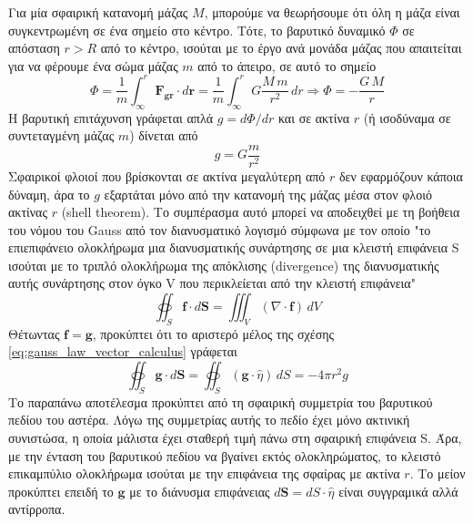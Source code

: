 Για μία σφαιρική κατανομή μάζας $M$, μπορούμε να θεωρήσουμε ότι όλη η μάζα είναι συγκεντρωμένη σε ένα σημείο στο κέντρο. Τότε, το βαρυτικό δυναμικό $\Phi$ σε απόσταση $r>R$ από το κέντρο, ισούται με το έργο ανά μονάδα μάζας που απαιτείται για να φέρουμε ένα σώμα μάζας $m$ από το άπειρο, σε αυτό το σημείο
\begin{equation}
    \Phi = \frac{1}{m}\int_{\infty}^{r} \boldsymbol{F_{\text{gr}}} \cdot d\boldsymbol{r} = \frac{1}{m} \int_{\infty}^{r} G\frac{M \,m }{r^2} \,dr \Rightarrow \Phi = - \frac{G \,M}{r}
\end{equation}
H βαρυτική επιτάχυνση γράφεται απλά $g = d\Phi / dr$ και σε ακτίνα $r$ (ή ισοδύναμα σε συντεταγμένη μάζας $m$) δίνεται από 
\begin{equation}
    \label{eq:gravitational_field}
    g = G \frac{m}{r^2}
\end{equation}
Σφαιρικοί φλοιοί που βρίσκονται σε ακτίνα μεγαλύτερη από $r$ δεν εφαρμόζουν κάποια δύναμη, άρα το $g$ εξαρτάται μόνο από την κατανομή της μάζας μέσα στον φλοιό ακτίνας $r$ (shell theorem). Το συμπέρασμα αυτό μπορεί να αποδειχθεί με τη βοήθεια του νόμου του Gauss από τον διανυσματικό λογισμό σύμφωνα με τον οποίο "το επιεπιφάνειο ολοκλήρωμα μια διανυσματικής συνάρτησης σε μια κλειστή επιφάνεια S ισούται με το τριπλό ολοκλήρωμα της απόκλισης (divergence) της διανυσματικής αυτής συνάρτησης στον όγκο V που περικλείεται από την κλειστή επιφάνεια"
\begin{equation}
    \label{eq:gauss_law_vector_calculus}
    \oiint_S \boldsymbol{f} \cdot d \boldsymbol{S} = \iiint_V (\nabla \cdot \boldsymbol{f}) \,dV 
\end{equation}
Θέτωντας $\boldsymbol{f} = \boldsymbol{g}$, προκύπτει ότι το αριστερό μέλος της σχέσης \eqref{eq:gauss_law_vector_calculus} γράφεται
\begin{equation}
    \label{eq:left_hand_side_gauss_law}
    \oiint_S \boldsymbol{g} \cdot d \boldsymbol{S} = \oiint_S (\boldsymbol{g} \cdot \hat{\eta}) \, dS = - 4\pi r^2 g
\end{equation}
Το παραπάνω αποτέλεσμα προκύπτει από τη σφαιρική συμμετρία του βαρυτικού πεδίου του αστέρα. Λόγω της συμμετρίας αυτής το πεδίο έχει μόνο ακτινική συνιστώσα, η οποία μάλιστα έχει σταθερή τιμή πάνω στη σφαιρική επιφάνεια S. Άρα, με την ένταση του βαρυτικού πεδίου να βγαίνει εκτός ολοκληρώματος, το κλειστό επικαμπύλιο ολοκλήρωμα ισούται με την επιφάνεια της σφαίρας με ακτίνα $r$. Το μείον προκύπτει επειδή το $\boldsymbol{g}$ με το διάνυσμα επιφάνειας $d\boldsymbol{S} = dS \cdot \hat{\eta}$ είναι συγγραμικά αλλά αντίρροπα.

